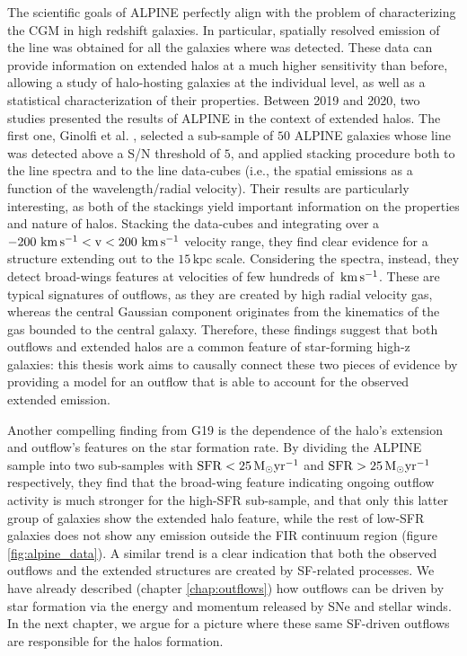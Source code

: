 The scientific goals of ALPINE perfectly align with the problem of characterizing the CGM in high redshift galaxies. In particular, spatially resolved emission of the \CII line was obtained for all the galaxies where \CII was detected. These data can provide information on extended halos at a much higher sensitivity than before, allowing a study of halo-hosting galaxies at the individual level, as well as a statistical characterization of their properties. Between 2019 and 2020, two studies presented the results of ALPINE in the context of extended \CII halos. The first one, Ginolfi et al. \citep[][hereafter G19]{ginolfi:2019}, selected a sub-sample of $50$ ALPINE galaxies whose \CII line was detected above a S/N threshold of $5$, and applied stacking procedure both to the \CII line spectra and to the \CII line data-cubes (i.e., the \CII spatial emissions as a function of the wavelength/radial velocity). Their results are particularly interesting, as both of the stackings yield important information on the properties and nature of \CII halos. Stacking the data-cubes and integrating over a $-200\,\,\rm km\,s^{-1}<v<200\,\,\rm km\,s^{-1}$ velocity range, they find clear evidence for a \CII structure extending out to the $15\,\mathrm{kpc}$ scale. Considering the spectra, instead, they detect broad-wings features at velocities of few hundreds of $\,\rm km\,s^{-1}$. These are typical signatures of outflows, as they are created by high radial velocity gas, whereas the central Gaussian component originates from the kinematics of the gas bounded to the central galaxy. Therefore, these findings suggest that both outflows and extended halos are a common feature of star-forming high-z galaxies: this thesis work aims to causally connect these two pieces of evidence by providing a model for an outflow that is able to account for the observed \CII extended emission. 

Another compelling finding from G19 is the dependence of the halo's extension and outflow's features on the star formation rate. By dividing the ALPINE sample into two sub-samples with $\mathrm{SFR}<25\,{\rm M}_{\odot}\mathrm{yr}^{-1}$ and $\mathrm{SFR}>25\,{\rm M}_{\odot}\mathrm{yr}^{-1}$ respectively, they find that the broad-wing feature indicating ongoing outflow activity is much stronger for the high-SFR sub-sample, and that only this latter group of galaxies show the extended halo feature, while the rest of low-SFR galaxies does not show any \CII emission outside the FIR continuum region (figure \ref{fig:alpine_data}). A similar trend is a clear indication that both the observed outflows and the extended \CII structures are created by SF-related processes. We have already described (chapter \ref{chap:outflows}) how outflows can be driven by star formation via the energy and momentum released by SNe and stellar winds. In the next chapter, we argue for a picture where these same SF-driven outflows are responsible for the \CII halos formation.


